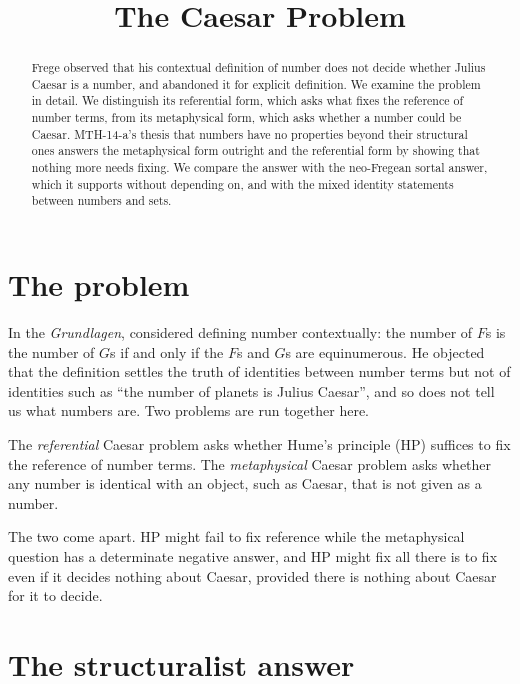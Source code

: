 \documentclass{situationist-preprint}
\title{The Caesar Problem}
\begin{document}
\maketitle

\begin{abstract}
Frege observed that his contextual definition of number does not decide whether Julius Caesar is a number, and abandoned it for explicit definition. We examine the problem in detail. We distinguish its referential form, which asks what fixes the reference of number terms, from its metaphysical form, which asks whether a number could be Caesar. MTH-14-a's thesis that numbers have no properties beyond their structural ones answers the metaphysical form outright and the referential form by showing that nothing more needs fixing. We compare the answer with the neo-Fregean sortal answer, which it supports without depending on, and with the mixed identity statements between numbers and sets.
\end{abstract}

\section{The problem}

In the \emph{Grundlagen}, \citet[§§56, 66]{Frege1884} considered defining number contextually: the number of $F$s is the number of $G$s if and only if the $F$s and $G$s are equinumerous. He objected that the definition settles the truth of identities between number terms but not of identities such as \enquote{the number of planets is Julius Caesar}, and so does not tell us what numbers are. Two problems are run together here.

\begin{definition}
The \emph{referential} Caesar problem asks whether Hume's principle (HP) suffices to fix the reference of number terms. The \emph{metaphysical} Caesar problem asks whether any number is identical with an object, such as Caesar, that is not given as a number.
\end{definition}

The two come apart. HP might fail to fix reference while the metaphysical question has a determinate negative answer, and HP might fix all there is to fix even if it decides nothing about Caesar, provided there is nothing about Caesar for it to decide.

\section{The structuralist answer}
\end{document}
